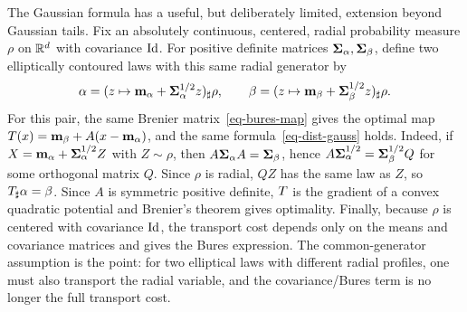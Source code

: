 \begin{rem}\label{rem-elliptical-bures}
	The Gaussian formula has a useful, but deliberately limited, extension beyond Gaussian tails. Fix an absolutely continuous, centered, radial probability measure $\rho$ on $\mathbb{R}^d$ with covariance $\mathrm{Id}$. For positive definite matrices $\mathbf{\Sigma}_\alpha,\mathbf{\Sigma}_\beta$, define two elliptically contoured laws with this same radial generator by
	\[
		\alpha=(z\mapsto \mathbf{m}_\alpha+\mathbf{\Sigma}_\alpha^{1/2}z)_\sharp\rho,
		\qquad
		\beta=(z\mapsto \mathbf{m}_\beta+\mathbf{\Sigma}_\beta^{1/2}z)_\sharp\rho.
	\]
	For this pair, the same Brenier matrix~\eqref{eq-bures-map} gives the optimal map $T(x)=\mathbf{m}_\beta+A(x-\mathbf{m}_\alpha)$, and the same formula~\eqref{eq-dist-gauss} holds. Indeed, if $X=\mathbf{m}_\alpha+\mathbf{\Sigma}_\alpha^{1/2}Z$ with $Z\sim\rho$, then $A\mathbf{\Sigma}_\alpha A=\mathbf{\Sigma}_\beta$, hence $A\mathbf{\Sigma}_\alpha^{1/2}=\mathbf{\Sigma}_\beta^{1/2}Q$ for some orthogonal matrix $Q$. Since $\rho$ is radial, $QZ$ has the same law as $Z$, so $T_\sharp\alpha=\beta$. Since $A$ is symmetric positive definite, $T$ is the gradient of a convex quadratic potential and Brenier's theorem gives optimality. Finally, because $\rho$ is centered with covariance $\mathrm{Id}$, the transport cost depends only on the means and covariance matrices and gives the Bures expression. The common-generator assumption is the point: for two elliptical laws with different radial profiles, one must also transport the radial variable, and the covariance/Bures term is no longer the full transport cost.
\end{rem}

